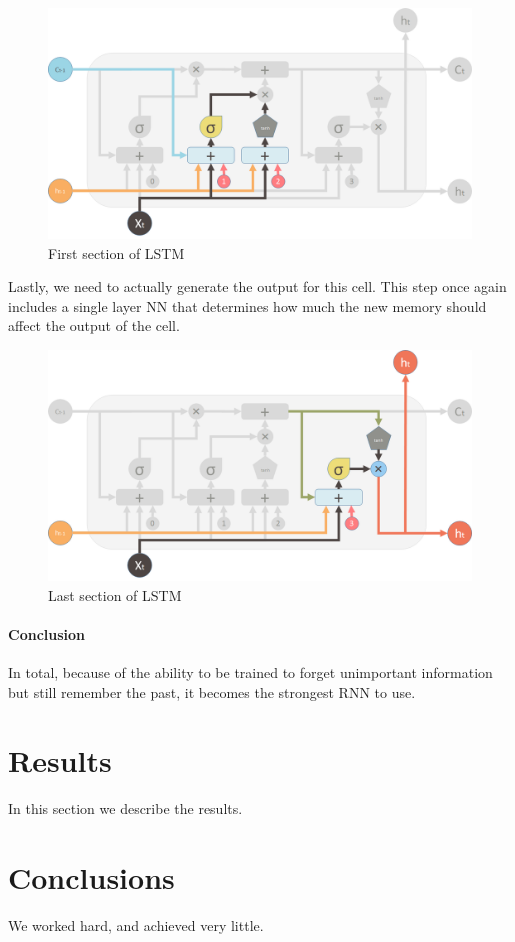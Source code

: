 \documentclass[12pt]{article}
\begin{document}
\begin{figure}[H]
  \includegraphics[width=\linewidth]{images/SecondValve.png}
  \caption{First section of LSTM}
\end{figure}

Lastly, we need to actually generate the output for this cell. This step once again includes a single layer NN that determines how much the new memory should affect the output of the cell.

\begin{figure}[H]
  \includegraphics[width=\linewidth]{images/LastValve.png}
  \caption{Last section of LSTM}
\end{figure}

\paragraph{Conclusion}
In total, because of the ability to be trained to forget unimportant information but still remember the past, it becomes the strongest RNN to use. 

\section{Results}\label{results}
In this section we describe the results.

\section{Conclusions}\label{conclusions}
We worked hard, and achieved very little.




\end{document}
